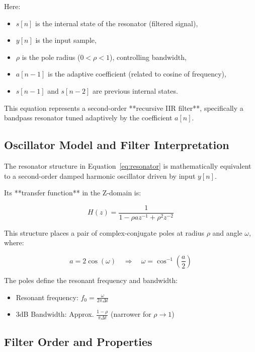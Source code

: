 \documentclass{article}
\begin{document}
Here:
\begin{itemize}
    \item $s[n]$ is the internal state of the resonator (filtered signal),
    \item $y[n]$ is the input sample,
    \item $\rho$ is the pole radius ($0 < \rho < 1$), controlling bandwidth,
    \item $a[n-1]$ is the adaptive coefficient (related to cosine of frequency),
    \item $s[n-1]$ and $s[n-2]$ are previous internal states.
\end{itemize}

This equation represents a second-order **recursive IIR filter**, specifically a bandpass resonator tuned adaptively by the coefficient $a[n]$.

\subsection{Oscillator Model and Filter Interpretation}

The resonator structure in Equation~\eqref{eq:resonator} is mathematically equivalent to a second-order damped harmonic oscillator driven by input $y[n]$.

Its **transfer function** in the Z-domain is:

\begin{equation}
H(z) = \frac{1}{1 - \rho a z^{-1} + \rho^2 z^{-2}}
\label{eq:resonator_tf}
\end{equation}

This structure places a pair of complex-conjugate poles at radius $\rho$ and angle $\omega$, where:

\[
a = 2\cos(\omega)
\quad \Rightarrow \quad
\omega = \cos^{-1}\left(\frac{a}{2}\right)
\]

The poles define the resonant frequency and bandwidth:
\begin{itemize}
    \item Resonant frequency: $f_0 = \frac{\omega}{2\pi\Delta t}$
    \item 3dB Bandwidth: Approx. $\frac{1 - \rho}{\pi \Delta t}$ (narrower for $\rho \to 1$)
\end{itemize}

\subsection{Filter Order and Properties}
\end{document}
